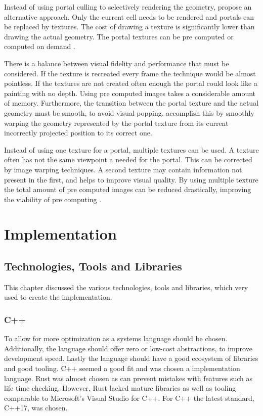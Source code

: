 Instead of using portal culling to selectively rendering the geometry, \textcite{aliaga:1997:architectural} propose an alternative approach. Only the current cell needs to be rendered and portals can be replaced by textures. The cost of drawing a texture is significantly lower than drawing the actual geometry. The portal textures can be pre computed or computed on demand \cite{aliaga:1997:architectural}. 

There is a balance between visual fidelity and performance that must be considered. If the texture is recreated every frame the technique would be almost pointless. If the textures are not created often enough the portal could look like a painting with no depth. Using pre computed images takes a considerable amount of memory. Furthermore, the transition between the portal texture and the actual geometry must be smooth, to avoid visual popping. \textcite{aliaga:1997:architectural} accomplish this by smoothly warping the geometry represented by the portal texture from its current incorrectly projected position to its correct one.

Instead of using one texture for a portal, multiple textures can be used. A texture often has not the same viewpoint a needed for the portal. This can be corrected by image warping techniques. A second texture may contain information not present in the first, and helps to improve visual quality. By using multiple texture the total amount of pre computed images can be reduced drastically, improving the viability of pre computing \cite{rafferty:1998:3d}.


\section{Implementation}

\subsection{Technologies, Tools and Libraries }
This chapter discussed the various technologies, tools and libraries, which very used to create the implementation.

\subsubsection{C++}
To allow for more optimization as a systems language should be chosen. Additionally, the language should offer zero or low-cost abstractions, to improve development speed. Lastly the language should have a good ecosystem of libraries and good tooling. C++ seemed a good fit and was chosen a implementation language. Rust \cite{rustlang} was almost chosen as can prevent mistakes with features such as life time checking. However, Rust lacked mature libraries as well as tooling comparable to Microsoft's Visual Studio \cite{microsoft:visualstudio} for C++. For C++ the latest standard, C++17, was chosen.




